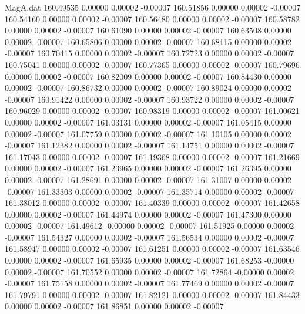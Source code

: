 \begin{filecontents}{MagA.dat}
 160.49535    0.00000    0.00002   -0.00007
 160.51856    0.00000    0.00002   -0.00007
 160.54160    0.00000    0.00002   -0.00007
 160.56480    0.00000    0.00002   -0.00007
 160.58782    0.00000    0.00002   -0.00007
 160.61090    0.00000    0.00002   -0.00007
 160.63508    0.00000    0.00002   -0.00007
 160.65806    0.00000    0.00002   -0.00007
 160.68115    0.00000    0.00002   -0.00007
 160.70415    0.00000    0.00002   -0.00007
 160.72723    0.00000    0.00002   -0.00007
 160.75041    0.00000    0.00002   -0.00007
 160.77365    0.00000    0.00002   -0.00007
 160.79696    0.00000    0.00002   -0.00007
 160.82009    0.00000    0.00002   -0.00007
 160.84430    0.00000    0.00002   -0.00007
 160.86732    0.00000    0.00002   -0.00007
 160.89024    0.00000    0.00002   -0.00007
 160.91422    0.00000    0.00002   -0.00007
 160.93722    0.00000    0.00002   -0.00007
 160.96029    0.00000    0.00002   -0.00007
 160.98319    0.00000    0.00002   -0.00007
 161.00621    0.00000    0.00002   -0.00007
 161.03131    0.00000    0.00002   -0.00007
 161.05415    0.00000    0.00002   -0.00007
 161.07759    0.00000    0.00002   -0.00007
 161.10105    0.00000    0.00002   -0.00007
 161.12382    0.00000    0.00002   -0.00007
 161.14751    0.00000    0.00002   -0.00007
 161.17043    0.00000    0.00002   -0.00007
 161.19368    0.00000    0.00002   -0.00007
 161.21669    0.00000    0.00002   -0.00007
 161.23965    0.00000    0.00002   -0.00007
 161.26395    0.00000    0.00002   -0.00007
 161.28691    0.00000    0.00002   -0.00007
 161.31007    0.00000    0.00002   -0.00007
 161.33303    0.00000    0.00002   -0.00007
 161.35714    0.00000    0.00002   -0.00007
 161.38012    0.00000    0.00002   -0.00007
 161.40339    0.00000    0.00002   -0.00007
 161.42658    0.00000    0.00002   -0.00007
 161.44974    0.00000    0.00002   -0.00007
 161.47300    0.00000    0.00002   -0.00007
 161.49612   -0.00000    0.00002   -0.00007
 161.51925    0.00000    0.00002   -0.00007
 161.54327    0.00000    0.00002   -0.00007
 161.56534    0.00000    0.00002   -0.00007
 161.58947    0.00000    0.00002   -0.00007
 161.61251    0.00000    0.00002   -0.00007
 161.63546    0.00000    0.00002   -0.00007
 161.65935    0.00000    0.00002   -0.00007
 161.68253   -0.00000    0.00002   -0.00007
 161.70552    0.00000    0.00002   -0.00007
 161.72864   -0.00000    0.00002   -0.00007
 161.75158    0.00000    0.00002   -0.00007
 161.77469    0.00000    0.00002   -0.00007
 161.79791    0.00000    0.00002   -0.00007
 161.82121    0.00000    0.00002   -0.00007
 161.84433    0.00000    0.00002   -0.00007
 161.86851    0.00000    0.00002   -0.00007

\end{filecontents}
